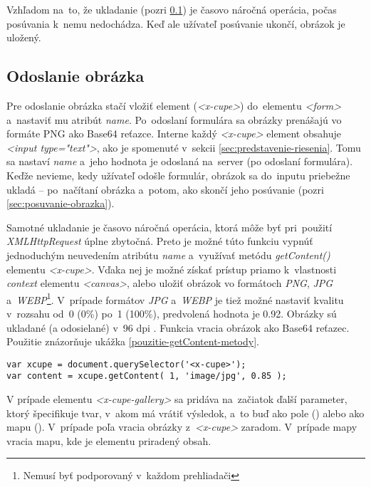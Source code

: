 Vzhľadom na~to, že ukladanie (pozri \ref{sec:odoslanie-obrazka}) je časovo náročná operácia, počas posúvania k~nemu nedochádza. Keď ale užívateľ posúvanie ukončí, obrázok je uložený.

\subsection{Odoslanie obrázka}
\label{sec:odoslanie-obrazka}

Pre odoslanie obrázka stačí vložiť element (\emph{<x-cupe>}) do~elementu \emph{<form>} a~nastaviť mu atribút \emph{name}. Po~odoslaní formulára sa obrázky prenášajú vo formáte PNG ako Base64 reťazce. Interne každý \emph{<x-cupe>} element obsahuje \emph{<input type="text"\textgreater}, ako je spomenuté v~sekcii \ref{sec:predstavenie-riesenia}. Tomu sa nastaví \emph{name} a~jeho hodnota je odoslaná na~server (po odoslaní formulára). Keďže nevieme, kedy užívateľ odošle formulár, obrázok sa do~inputu priebežne ukladá -- po~načítaní obrázka a~potom, ako skončí jeho posúvanie (pozri \ref{sec:posuvanie-obrazka}).

Samotné ukladanie je časovo náročná operácia, ktorá môže byť pri~použití \emph{XMLHttpRequest} úplne zbytočná. Preto je možné túto funkciu vypnúť jednoduchým neuvedením atribútu \emph{name} a~využívať metódu \emph{getContent()} elementu \emph{<x-cupe>}. Vďaka nej je možné získať prístup priamo k~vlastnosti \emph{context} elementu \emph{<canvas>}, alebo uložiť obrázok vo formátoch \emph{PNG}, \emph{JPG} a~\emph{WEBP}\footnote{Nemusí byť podporovaný v~každom prehliadači}. V~prípade formátov \emph{JPG} a~\emph{WEBP} je tiež možné nastaviť kvalitu v~rozsahu od~0 (0\%) po~1 (100\%), predvolená hodnota je 0.92. Obrázky sú ukladané (a odosielané) v~96 dpi \cite{Canvas_toURL}. Funkcia vracia obrázok ako Base64 reťazec. Použitie znázorňuje ukážka \ref{pouzitie-getContent-metody}.

\begin{lstlisting}[label=pouzitie-getContent-metody,caption=Použitie metódy getContent() pre~získanie obrázka.]
var xcupe = document.querySelector('<x-cupe>');
var content = xcupe.getContent( 1, 'image/jpg', 0.85 );
\end{lstlisting}

V prípade elementu \emph{<x-cupe-gallery>} sa pridáva na~začiatok ďalší parameter, ktorý špecifikuje tvar, v~akom má vrátiť výsledok, a~to buď ako pole () alebo ako mapu (). V~prípade poľa vracia obrázky z~\emph{<x-cupe>} zaradom. V~prípade mapy vracia mapu, kde je elementu priradený obsah.

